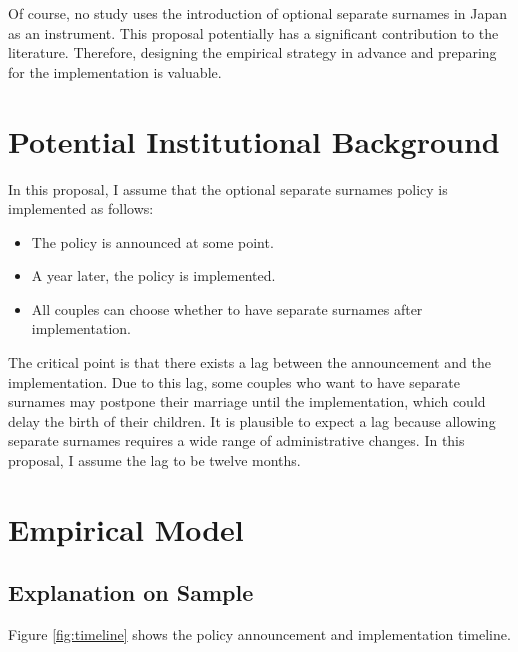 \documentclass[12pt]{article}
\begin{document}
Of course, no study uses the introduction of optional separate surnames in Japan as an instrument.
This proposal potentially has a significant contribution to the literature.
Therefore, designing the empirical strategy in advance and preparing for the implementation is valuable.


\section{Potential Institutional Background}
In this proposal, I assume that the optional separate surnames policy is implemented as follows: 
\begin{itemize}
  \item The policy is announced at some point. 
  \item A year later, the policy is implemented.
  \item All couples can choose whether to have separate surnames after implementation.
\end{itemize}
The critical point is that there exists a lag between the announcement and the implementation.
Due to this lag, some couples who want to have separate surnames may postpone their marriage until the implementation, which could delay the birth of their children.
It is plausible to expect a lag because allowing separate surnames requires a wide range of administrative changes.
In this proposal, I assume the lag to be twelve months.

\section{Empirical Model}
\subsection*{Explanation on Sample}
Figure \ref{fig:timeline} shows the policy announcement and implementation timeline.
\end{document}
